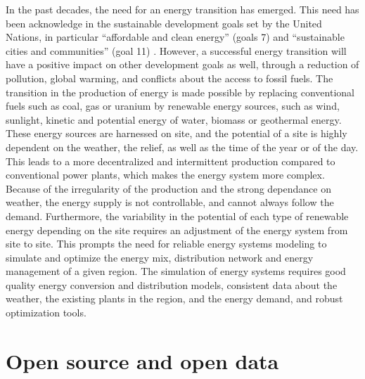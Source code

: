 In the past decades, the need for an energy transition has emerged. This need has been acknowledge in the sustainable development goals \cite{un_sdgs} set by the United Nations, in particular ``affordable and clean energy'' (goals 7) \cite{un_sdg7} and ``sustainable cities and communities'' (goal 11) \cite{un_sdg11}. However, a successful energy transition will have a positive impact on other development goals as well, through a reduction of pollution, global warming, and conflicts about the access to fossil fuels. \newline
The transition in the production of energy is made possible by replacing conventional fuels such as coal, gas or uranium by renewable energy sources, such as wind, sunlight, kinetic and potential energy of water, biomass or geothermal energy. These energy sources are harnessed on site, and the potential of a site is highly dependent on the weather, the relief, as well as the time of the year or of the day. This leads to a more decentralized and intermittent production compared to conventional power plants, which makes the energy system more complex. \newline
Because of the irregularity of the production and the strong dependance on weather, the energy supply is not controllable, and cannot always follow the demand. Furthermore, the variability in the potential of each type of renewable energy depending on the site requires an adjustment of the energy system from site to site. This prompts the need for reliable energy systems modeling to simulate and optimize the energy mix, distribution network and energy management of a given region. The simulation of energy systems requires good quality energy conversion and distribution models, consistent data about the weather, the existing plants in the region, and the energy demand, and robust optimization tools.


\section{Open source and open data}

